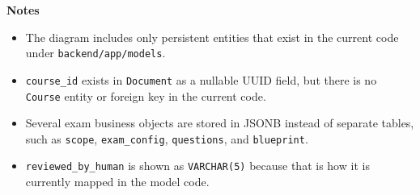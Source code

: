 \documentclass[12pt]{article}
\begin{document}
\noindent\textbf{Notes}
\begin{itemize}
  \item The diagram includes only persistent entities that exist in the current code under \texttt{backend/app/models}.
  \item \texttt{course\_id} exists in \texttt{Document} as a nullable UUID field, but there is no \texttt{Course} entity or foreign key in the current code.
  \item Several exam business objects are stored in JSONB instead of separate tables, such as \texttt{scope}, \texttt{exam\_config}, \texttt{questions}, and \texttt{blueprint}.
  \item \texttt{reviewed\_by\_human} is shown as \texttt{VARCHAR(5)} because that is how it is currently mapped in the model code.
\end{itemize}
\end{document}
